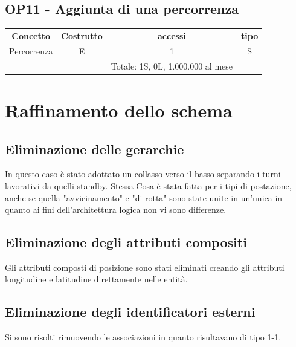     \subsection*{OP11 - Aggiunta di una percorrenza}
    \begin{table}[H]
    \centering
    \begin{tabular}{cccc}
  
    \rowcolor{tableheadercolor}
    \textbf{Concetto} & \textbf{Costrutto} & \textbf{accessi} & \textbf{tipo}\\
  
    Percorrenza & E & 1 & S \\\
    & & Totale: 1S, 0L, 1.000.000 al mese &\\
  
    \end{tabular}
    \end{table}
  
\section{Raffinamento dello schema}
\subsection*{Eliminazione delle gerarchie}
In questo caso è stato adottato un collasso verso il basso separando i turni lavorativi da quelli standby. 
Stessa Cosa è stata fatta per i tipi di postazione, anche se quella "avvicinamento" e "di rotta" sono state unite in un'unica in quanto ai fini dell'architettura logica non vi sono differenze.


\subsection*{Eliminazione degli attributi compositi}
Gli attributi composti di posizione sono stati eliminati creando gli attributi longitudine e latitudine direttamente nelle entità.
\subsection*{Eliminazione degli identificatori esterni}
Si sono risolti rimuovendo le associazioni in quanto risultavano di tipo 1-1.
